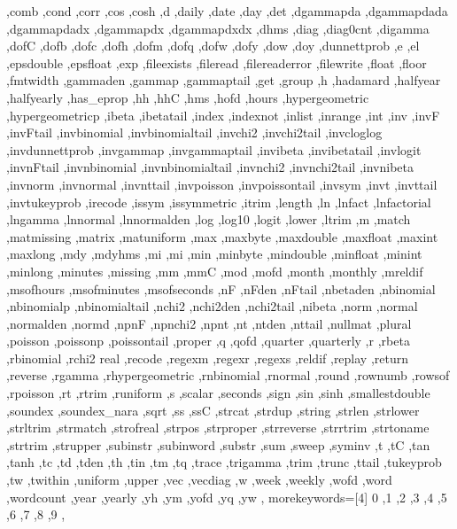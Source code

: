{{    ,comb ,cond ,corr ,cos ,cosh ,d ,daily ,date ,day ,det ,dgammapda
    ,dgammapdada ,dgammapdadx ,dgammapdx ,dgammapdxdx ,dhms ,diag
    ,diag0cnt ,digamma ,dofC ,dofb ,dofc ,dofh ,dofm ,dofq ,dofw ,dofy
    ,dow ,doy ,dunnettprob ,e ,el ,epsdouble ,epsfloat ,exp ,fileexists
    ,fileread ,filereaderror ,filewrite ,float ,floor ,fmtwidth
    ,gammaden ,gammap ,gammaptail ,get ,group ,h ,hadamard ,halfyear
    ,halfyearly ,has_eprop ,hh ,hhC ,hms ,hofd ,hours ,hypergeometric
    ,hypergeometricp ,ibeta ,ibetatail ,index ,indexnot ,inlist
    ,inrange ,int ,inv ,invF ,invFtail ,invbinomial ,invbinomialtail
    ,invchi2 ,invchi2tail ,invcloglog ,invdunnettprob ,invgammap
    ,invgammaptail ,invibeta ,invibetatail ,invlogit ,invnFtail
    ,invnbinomial ,invnbinomialtail ,invnchi2 ,invnchi2tail ,invnibeta
    ,invnorm ,invnormal ,invnttail ,invpoisson ,invpoissontail ,invsym
    ,invt ,invttail ,invtukeyprob ,irecode ,issym ,issymmetric ,itrim
    ,length ,ln ,lnfact ,lnfactorial ,lngamma ,lnnormal ,lnnormalden
    ,log ,log10 ,logit ,lower ,ltrim ,m ,match ,matmissing ,matrix
    ,matuniform ,max ,maxbyte ,maxdouble ,maxfloat ,maxint ,maxlong ,mdy
    ,mdyhms ,mi ,mi ,min ,minbyte ,mindouble ,minfloat ,minint ,minlong
    ,minutes ,missing ,mm ,mmC ,mod ,mofd ,month ,monthly ,mreldif
    ,msofhours ,msofminutes ,msofseconds ,nF ,nFden ,nFtail ,nbetaden
    ,nbinomial ,nbinomialp ,nbinomialtail ,nchi2 ,nchi2den ,nchi2tail
    ,nibeta ,norm ,normal ,normalden ,normd ,npnF ,npnchi2 ,npnt ,nt
    ,ntden ,nttail ,nullmat ,plural ,poisson ,poissonp ,poissontail
    ,proper ,q ,qofd ,quarter ,quarterly ,r ,rbeta ,rbinomial ,rchi2
    real ,recode ,regexm ,regexr ,regexs ,reldif ,replay ,return
    ,reverse ,rgamma ,rhypergeometric ,rnbinomial ,rnormal ,round
    ,rownumb ,rowsof ,rpoisson ,rt ,rtrim ,runiform ,s ,scalar ,seconds
    ,sign ,sin ,sinh ,smallestdouble ,soundex ,soundex_nara ,sqrt ,ss
    ,ssC ,strcat ,strdup ,string ,strlen ,strlower ,strltrim ,strmatch
    ,strofreal ,strpos ,strproper ,strreverse ,strrtrim ,strtoname
    ,strtrim ,strupper ,subinstr ,subinword ,substr ,sum ,sweep ,syminv
    ,t ,tC ,tan ,tanh ,tc ,td ,tden ,th ,tin ,tm ,tq ,trace ,trigamma
    ,trim ,trunc ,ttail ,tukeyprob ,tw ,twithin ,uniform ,upper ,vec
    ,vecdiag ,w ,week ,weekly ,wofd ,word ,wordcount ,year ,yearly
    ,yh ,ym ,yofd ,yq ,yw
  },
  morekeywords=[4]{
    0 ,1 ,2 ,3 ,4 ,5 ,6 ,7 ,8 ,9
  },
}


